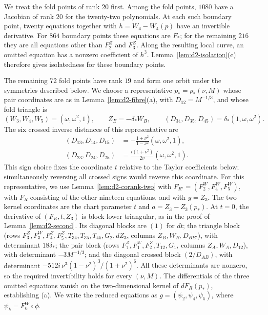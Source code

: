 \documentclass[Threeside,11pt]{article}
\theoremstyle{definition}
\theoremstyle{remark}
\numberwithin{equation}{section}
\theoremstyle{remark}
\begin{document}
{We treat the fold points of rank $20$ first.
Among the fold points, $1080$ have a Jacobian of rank $20$ for the
twenty-two polynomials.  At each such boundary point, twenty equations together with
$h=W_4-W_4(p)$ have an invertible derivative.
For $864$ boundary points these equations are $F_*$; for the remaining $216$ they are
all equations other than $F^Z_2$ and $F^Z_3$.
Along the resulting local curve, an omitted equation has a nonzero coefficient of
$h^3$.  Lemma~\ref{lem:d2-isolation}(c) therefore gives isolatedness for these boundary points.}

{The remaining $72$ fold points have rank $19$ and form one orbit
under the symmetries described below.
We choose a representative $p_*=p_*(\nu,M)$ whose pair coordinates are as in
Lemma~\ref{lem:d2-fibre}(a), with $D_{12}=M^{-1/3}$, and whose fold triangle is}
\[
  (W_3,W_4,W_5)=(\omega,\omega^2,1),\qquad Z_B=-\delta_*W_B,\qquad
  (D_{34},D_{35},D_{45})=\delta_*(1,\omega,\omega^2).
\]
{The six crossed inverse distances of this representative are
\[
\begin{aligned}
 (D_{13},D_{14},D_{15})&=-\frac{1+\nu^2}{1-\nu^2}(\omega,\omega^2,1),\\
 (D_{23},D_{24},D_{25})&=\frac{i(1+\nu^2)}{2\nu}(\omega,\omega^2,1).
\end{aligned}
\]
This sign choice fixes the coordinate $t$ relative to the Taylor coefficients below;
simultaneously reversing all crossed signs would reverse this coordinate.}
{For this representative, we use Lemma~\ref{lem:d2-corank-two} with
$F_{R'}=(F^W_2,F^W_4,F^W_5)$, with $F_R$ consisting of the other nineteen equations, and
with $y=Z_3$.
The two kernel coordinates are the chart parameter $t$ and $a=Z_3-Z_3(p_*)$.
At $t=0$, the derivative of $(F_R,t,Z_3)$ is block lower triangular, as in the proof of
Lemma~\ref{lem:d2-second}.
Its diagonal blocks are $(1)$ for $dt$; the triangle block}
(rows $F^Z_3,F^W_3,F^Z_4,F^Z_5,T_{34},T_{35},T_{45},G_2,dZ_3$, columns $Z_B,W_B,D_{BB'}$), with
determinant $18\delta_*$; the pair block (rows $F^Z_1,F^W_1,F^Z_2,T_{12},G_1$, columns
$Z_A,W_A,D_{12}$), with determinant $-3M^{-1/3}$; and the diagonal crossed block $(2/D_{AB})$,
with determinant $-512i\,\nu^3(1-\nu^2)^3/(1+\nu^2)^6$.
{All these determinants are nonzero, so the required invertibility
holds for every $(\nu,M)$.
The differentials of the three omitted equations vanish on the two-dimensional kernel
of $dF_R(p_*)$, establishing (a).
We write the reduced equations as $g=(\psi_2,\psi_4,\psi_5)$, where
$\psi_k=F^W_k\circ\phi$.}
\end{document}
